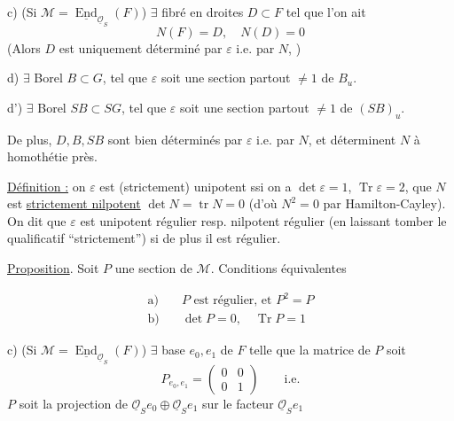c) (Si $\mathcal M=\underline{\operatorname{End}}_{\underline{\mathcal O}_S}(F)$) $\exists$ fibré en droites $D\subset F$ tel que l'on ait
\[
N(F)=D,\quad N(D)=0
\]
(Alors $D$ est uniquement déterminé par $\varepsilon$ i.e. par $N$,  )


d) $\exists$ Borel $B\subset G$, tel que $\varepsilon$ soit une section partout $\ne1$ de $B_u$.

d') $\exists$ Borel $SB\subset SG$, tel que $\varepsilon$ soit une section partout $\ne1$ de $(SB)_u$.

 De plus, $D,B,SB$ sont bien déterminés par $\varepsilon$ i.e. par $N$, et déterminent $N$ à homothétie près.

\uline{Définition :} on   $\varepsilon$ est (strictement) unipotent ssi on a $\det\varepsilon=1$, $\operatorname{Tr}\varepsilon=2$, que $N$ est \uline{strictement nilpotent}  $\det N=\operatorname{tr}N=0$ (d'où $N^2=0$ par Hamilton-Cayley). On dit que $\varepsilon$ est unipotent régulier resp. nilpotent régulier (en laissant tomber le qualificatif ``strictement'') si de plus il est régulier.



\uline{Proposition}. Soit $P$ une section de $\mathcal M$. Conditions équivalentes

\[
\begin{aligned}
\text{a)}\quad &P\text{ est régulier, et }P^2=P\\
\text{b)}\quad &\det P=0,\quad\operatorname{Tr}P=1
\end{aligned}
\]

c) (Si $\mathcal M=\underline{\operatorname{End}}_{\underline{\mathcal O}_S}(F)$) $\exists$ base $e_0,e_1$ de $F$ telle que la matrice de $P$ soit
\[
P_{e_0,e_1}=\begin{pmatrix}0&0\\0&1\end{pmatrix}\qquad\text{i.e.}
\]
$P$ soit la projection de $\underline{\mathcal O}_S e_0\oplus\underline{\mathcal O}_S e_1$ sur le facteur $\underline{\mathcal O}_S e_1$

